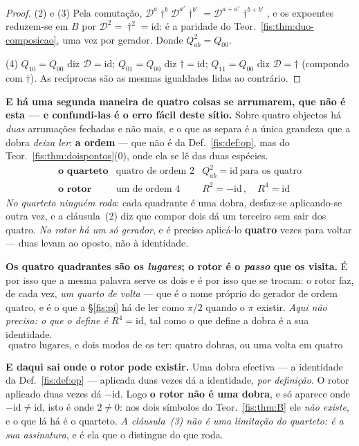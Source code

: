 \documentclass[livro.tex]{subfiles}
\begin{document}
\begin{proof}
(2) e (3) Pela comutação, $\mathcal{D}^{a}\dagger^{b}\mathcal{D}^{a'}\dagger^{b'}
=\mathcal{D}^{a+a'}\dagger^{b+b'}$, e os expoentes reduzem-se em $B$ por
$\mathcal{D}^{2}=\dagger^{2}=\mathrm{id}$: é a paridade do
Teor.~\ref{fis:thm:duo-composicao}, uma vez por gerador. Donde
$Q_{ab}^{2}=Q_{00}$.

(4) $Q_{10}=Q_{00}$ diz $\mathcal{D}=\mathrm{id}$; $Q_{01}=Q_{00}$ diz
$\dagger=\mathrm{id}$; $Q_{11}=Q_{00}$ diz $\mathcal{D}=\dagger$ (compondo com
$\dagger$). As recíprocas são as mesmas igualdades lidas ao contrário.
\end{proof}

\medskip\noindent\textbf{E há uma segunda maneira de quatro coisas se
arrumarem, que não é esta --- e confundi-las é o erro fácil deste sítio.} Sobre
quatro objectos há \emph{duas} arrumações fechadas e não mais, e o que as separa
é a única grandeza que a dobra \emph{deixa ler}: \textbf{a ordem} --- que não é da
Def.~\ref{fis:def:op}, mas do Teor.~\ref{fis:thm:doispontos}(0), onde ela se lê
das duas espécies.
\[
\begin{array}{lll}
\textbf{o quarteto} & \text{quatro de ordem }2 & Q_{ab}^{2}=\mathrm{id}\ \text{para os quatro}\\[2pt]
\textbf{o rotor} & \text{um de ordem }4 & R^{2}=-\mathrm{id}\,,\quad R^{4}=\mathrm{id}
\end{array}
\]
\emph{No quarteto ninguém roda}: cada quadrante é uma dobra, desfaz-se
aplicando-se outra vez, e a cláusula~(2) diz que compor dois dá um terceiro sem
sair dos quatro. \emph{No rotor há um só gerador}, e é preciso aplicá-lo
\textbf{quatro} vezes para voltar --- duas levam ao oposto, não à identidade.

\medskip\noindent\textbf{Os quatro quadrantes são os \emph{lugares}; o rotor é o
\emph{passo} que os visita.} É por isso que a mesma palavra serve os dois e é
por isso que se trocam: o rotor faz, de cada vez, \emph{um quarto de volta} ---
que é o nome próprio do gerador de ordem quatro, e é o que a §\ref{fis:pi} há de
ler como $\pi/2$ quando o $\pi$ existir. \emph{Aqui não precisa: o que o define é
$R^{4}=\mathrm{id}$}, tal como o que define a dobra é a sua identidade.
\[
\boxed{\;\text{quatro lugares, e dois modos de os ter: quatro dobras, ou uma volta em quatro passos}\;}
\]

\medskip\noindent\textbf{E daqui sai onde o rotor pode existir.} Uma dobra efectiva ---
a identidade da Def.~\ref{fis:def:op} --- aplicada duas vezes dá a identidade,
\emph{por definição}. O rotor aplicado duas vezes dá $-\mathrm{id}$. Logo \textbf{o rotor
não é uma dobra}, e só aparece onde $-\mathrm{id}\neq\mathrm{id}$, isto é onde
$2\neq0$: nos dois símbolos do Teor.~\ref{fis:thm:B} ele \emph{não existe}, e o
que lá há é o quarteto. \emph{A cláusula~(3) não é uma limitação do quarteto: é a
sua assinatura}, e é ela que o distingue do que roda.
\end{document}
